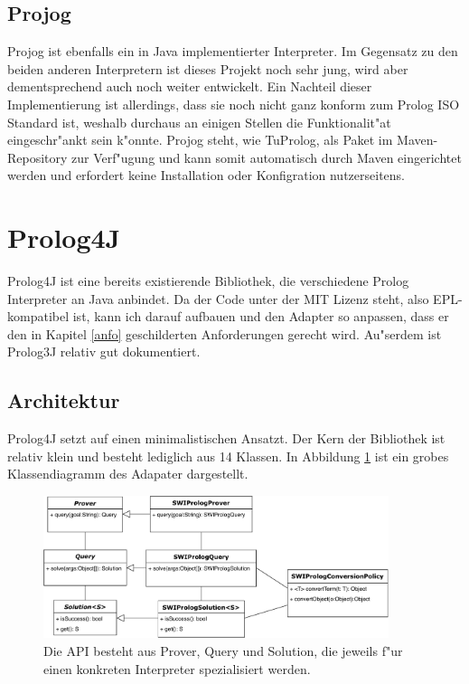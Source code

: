 \subsection{Projog}
Projog\cite{projog} ist ebenfalls ein in Java implementierter Interpreter. Im Gegensatz zu den beiden anderen Interpretern ist dieses Projekt noch sehr jung, wird aber dementsprechend auch noch weiter entwickelt. Ein Nachteil dieser Implementierung ist allerdings, dass sie noch nicht ganz konform zum Prolog ISO Standard ist, weshalb durchaus an einigen Stellen die Funktionalit"at eingeschr"ankt sein k"onnte. Projog steht, wie TuProlog, als Paket im Maven-Repository zur Verf"ugung und kann somit automatisch durch Maven eingerichtet werden und erfordert keine Installation oder Konfigration nutzerseitens.

\section{Prolog4J}
Prolog4J\cite{prolog4j} ist eine bereits existierende Bibliothek, die verschiedene Prolog Interpreter an Java anbindet. Da der Code unter der MIT Lizenz steht, also EPL-kompatibel ist, kann ich darauf aufbauen und den Adapter so anpassen, dass er den in Kapitel \ref{anfo} geschilderten Anforderungen gerecht wird. Au"serdem ist Prolog3J relativ gut dokumentiert\cite{prolog4jdoku}.

\subsection{Architektur}
Prolog4J setzt auf einen minimalistischen Ansatzt. Der Kern der Bibliothek ist relativ klein und besteht lediglich aus 14 Klassen. In Abbildung \ref{fig:prolog4jj} ist ein grobes Klassendiagramm des Adapater dargestellt.
\begin{figure}[h]
\centering
\includegraphics[width=0.9\textwidth]{prolog4j.pdf}
\caption{Die API besteht aus Prover, Query und Solution, die jeweils f"ur einen konkreten Interpreter spezialisiert werden.}
\label{fig:prolog4jj}
\end{figure}



